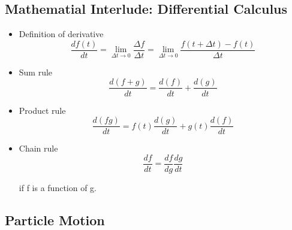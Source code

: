 \documentclass[../main.tex]{subfiles}
\begin{document}
\subsection{Mathematial Interlude: Differential Calculus}
\begin{itemize}
    \item Definition of derivative
        \begin{equation}
            \frac{d f(t)}{d t}=\lim _{\Delta t \rightarrow 0} \frac{\Delta f}{\Delta t}=\lim _{\Delta t \rightarrow 0} \frac{f(t+\Delta t)-f(t)}{\Delta t}
        \end{equation}

    \item Sum rule
        \begin{equation}
            \frac{d(f+g)}{d t}=\frac{d(f)}{d t}+\frac{d(g)}{d t}
        \end{equation}

    \item Product rule
        \begin{equation}
            \frac{d(f g)}{d t}=f(t) \frac{d(g)}{d t}+g(t) \frac{d(f)}{d t}
        \end{equation}

    \item Chain rule
        \begin{equation}
            \frac{d f}{d t}=\frac{d f}{d g} \frac{d g}{d t}
        \end{equation}

        if f is a function of g.
\end{itemize}

\subsection{Particle Motion}
\end{document}
